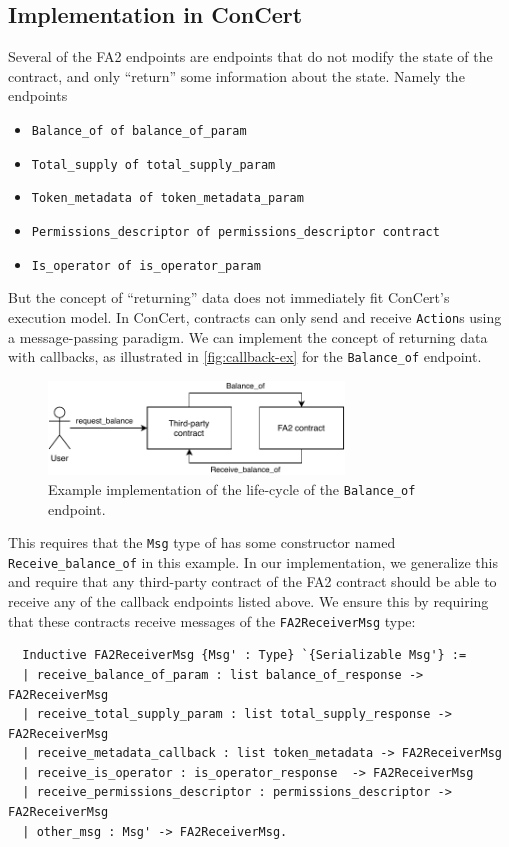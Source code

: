 \documentclass[twoside,11pt,openright]{report}
\newenvironment{code}{\captionsetup{type=figure, singlelinecheck=off, justification=raggedleft}}{}
\newcommand{\coq}[1]{\texttt{#1}}
\begin{document}
\subsection{Implementation in ConCert}
\label{sec:fa2-implementation}
Several of the FA2 endpoints are endpoints that do not modify the state of the contract, and only ``return'' some information about the state. Namely the endpoints
\begin{itemize}
    \item \coq{Balance\_of of balance\_of\_param}
    \item \coq{Total\_supply of total\_supply\_param}
    \item \coq{Token\_metadata of token\_metadata\_param}
    \item \coq{Permissions\_descriptor of permissions\_descriptor contract}
    \item \coq{Is\_operator of is\_operator\_param}
\end{itemize}
But the concept of ``returning'' data does not immediately fit ConCert's execution model. In ConCert, contracts can only send and receive \coq{Action}s using a message-passing paradigm. We can implement the concept of returning data with callbacks, as illustrated in \autoref{fig:callback-ex} for the \coq{Balance\_of} endpoint. 
\begin{figure}[h]
\begin{center}
\includegraphics[width=0.7\textwidth]{media/balance_of_callback.pdf}
\end{center}
\caption{Example implementation of the life-cycle of the \coq{Balance\_of} endpoint.}
\label{fig:callback-ex}
\end{figure}
This requires that the \coq{Msg} type of has some constructor named \coq{Receive\_balance\_of} in this example. In our implementation, we generalize this and require that any third-party contract of the FA2 contract should be able to receive any of the callback endpoints listed above. We ensure this by requiring that these contracts receive messages of the \coq{FA2ReceiverMsg} type:
\begin{code}
\begin{verbatim}
  Inductive FA2ReceiverMsg {Msg' : Type} `{Serializable Msg'} :=
  | receive_balance_of_param : list balance_of_response -> FA2ReceiverMsg
  | receive_total_supply_param : list total_supply_response -> FA2ReceiverMsg
  | receive_metadata_callback : list token_metadata -> FA2ReceiverMsg
  | receive_is_operator : is_operator_response  -> FA2ReceiverMsg
  | receive_permissions_descriptor : permissions_descriptor -> FA2ReceiverMsg
  | other_msg : Msg' -> FA2ReceiverMsg.
\end{verbatim}
\end{code}
\end{document}
